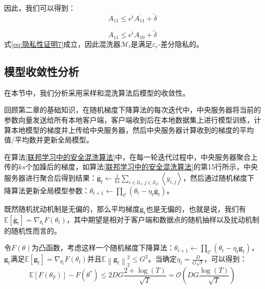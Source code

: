 因此，我们可以得到：
\begin{equation}\label{隐私性证明8}
A_{11} \leq e^{\tilde{\epsilon}} A_{11}^{\prime}+\tilde{\delta}
\end{equation}

\begin{equation}\label{隐私性证明9}
A_{11} \leq e^{\tilde{\epsilon}} A_{10}+\tilde{\delta}
\end{equation}
式\ref{eq:隐私性证明7}成立，因此混洗器$\mathcal{M}_{t}$是满足$\varepsilon_{\mathrm{c}}$-差分隐私的。

\subsection{模型收敛性分析}
在本节中，我们分析采用采样和混洗算法后模型的收敛性。

回顾第二章的基础知识，在随机梯度下降算法的每次迭代中，中央服务器将当前的参数向量发送给所有本地客户端，客户端收到后在本地数据集上进行模型训练，计算本地模型的梯度并上传给中央服务器，然后中央服务器计算收到的梯度的平均值/平均数并更新全局模型。

在算法\ref{联邦学习中的安全混洗算法}中，在每一轮迭代过程中，中央服务器聚合上传的$ks$个加躁后的梯度，如算法\ref{联邦学习中的安全混洗算法}的第15行所示，中央服务器进行聚合后得到结果：$\overline{\mathbf{g}}_{t} \leftarrow \frac{1}{k s} \sum_{i \in \mathcal{U}_{t}, j \in \mathcal{S}_{i t}} \left\langle y_{i,j} \right\rangle$，然后通过随机梯度下降算法更新全局模型参数：$\theta_{t+1} \leftarrow \prod_{\mathcal{C}}\left(\theta_{t}-\eta_{t} \overline{\mathbf{g}}_{t}\right)$。

既然随机扰动机制是无偏的，那么平均梯度$\overline{\mathbf{g}}_{t}$也是无偏的，也就是说，我们有 $\mathbb{E}\left[\overline{\mathbf{g}}_{t}\right]=\nabla_{\theta_{t}} F\left(\theta_{t}\right)$，其中期望是相对于客户端和数据点的随机抽样以及扰动机制的随机性而言的。

令$F(\theta)$为凸函数，考虑这样一个随机梯度下降算法：$\theta_{t+1} \leftarrow \prod_{\mathcal{C}}\left(\theta_{t}-\eta_{t} \mathbf{g}_{t}\right)$，$\mathbf{g}_{t}$满足$\mathbb{E}\left[\mathbf{g}_{t}\right]=\nabla_{\theta_{t}} F\left(\theta_{t}\right)$并且$\mathbb{E}\left\|\mathbf{g}_{t}\right\|_{2}^{2} \leq G^{2}$。当确定$\eta_{t}=\frac{D}{G \sqrt{t}}$，可以得到：
\begin{equation}\label{eq：模型收敛性证明1}
\mathbb{E}\left[F\left(\theta_{T}\right)\right]-F\left(\theta^{*}\right) \leq 2 D G \frac{2+\log (T)}{\sqrt{T}}=\mathcal{O}\left(D G \frac{\log (T)}{\sqrt{T}}\right)
\end{equation} 

